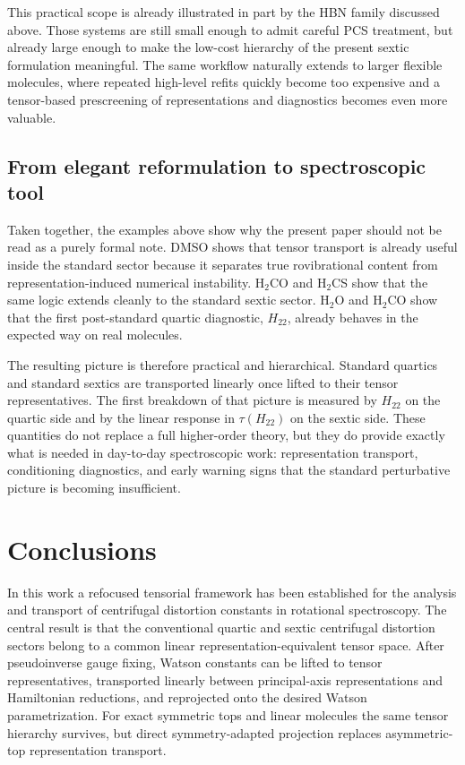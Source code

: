 \documentclass[journal=jacsat,manuscript=article]{achemso}
\begin{document}
This practical scope is already illustrated in part by the HBN family
discussed above. Those systems are still small enough to admit careful PCS
treatment, but already large enough to make the low-cost hierarchy of the
present sextic formulation meaningful. The same workflow naturally extends to
larger flexible molecules, where repeated high-level refits quickly become
too expensive and a tensor-based prescreening of representations and
diagnostics becomes even more valuable.

\subsection{From elegant reformulation to spectroscopic tool}

Taken together, the examples above show why the present paper should not be
read as a purely formal note. DMSO shows that tensor transport is already
useful inside the standard sector because it separates true rovibrational
content from representation-induced numerical instability. H$_2$CO and
H$_2$CS show that the same logic extends cleanly to the standard sextic
sector. H$_2$O and H$_2$CO show that the first post-standard quartic
diagnostic, $H_{22}$, already behaves in the expected way on real molecules.

The resulting picture is therefore practical and hierarchical. Standard
quartics and standard sextics are transported linearly once lifted to their
tensor representatives. The first breakdown of that picture is measured by
$H_{22}$ on the quartic side and by the linear response in $\tau(H_{22})$ on
the sextic side. These quantities do not replace a full higher-order theory,
but they do provide exactly what is needed in day-to-day spectroscopic work:
representation transport, conditioning diagnostics, and early warning signs
that the standard perturbative picture is becoming insufficient.


\section{Conclusions}

In this work a refocused tensorial framework has been established for the
analysis and transport of centrifugal distortion constants in rotational
spectroscopy. The central result is that the conventional quartic and
sextic centrifugal distortion sectors belong to a common linear
representation-equivalent tensor space. After pseudoinverse gauge fixing,
Watson constants can be lifted to tensor representatives, transported
linearly between principal-axis representations and Hamiltonian
reductions, and reprojected onto the desired Watson parametrization.
For exact symmetric tops and linear molecules the same tensor hierarchy
survives, but direct symmetry-adapted projection replaces asymmetric-top
representation transport.
\end{document}
